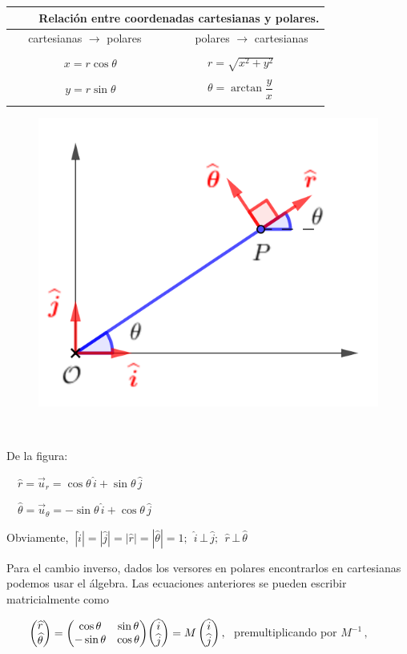 \begin{table}[H]
\centering
\begin{tabular}{|ll|}
\hline
\multicolumn{2}{|c|}{\textbf{$\qquad$ Relación entre coordenadas cartesianas y polares. }}                          \\ \hline
\multicolumn{1}{|c|}{$\quad$ cartesianas $\to$ polares $\qquad$} & $\quad$ polares $\to$ cartesianas $\ \ $ \\ \hline
\multicolumn{1}{|c|}{} & \\
\multicolumn{1}{|c|}{$x=r\cos \theta$} & $\qquad \ \ r=\sqrt{x^2+y^2}$ \\ 
\multicolumn{1}{|c|}{} & \\
\multicolumn{1}{|c|}{$y=r\sin \theta$} & $\qquad \ \  \theta = \arctan \dfrac y x$ \\ 
\multicolumn{1}{|c|}{} & \\ \hline
\end{tabular}
\end{table}

\begin{multicols}{2}
	\begin{figure}[H]
	\centering
	\includegraphics[width=.3\textwidth]{img-coordenadas/coordenadas-03.png}
	\end{figure}
	$\quad$
	
	De la figura:
	
	$\quad \widehat r=\vec u_r=\cos \theta \, \widehat i + \sin \theta \, \widehat j$
	
	$\quad \widehat \theta=\vec u_\theta=-\sin \theta \, \widehat i + \cos \theta \, \widehat j$
\end{multicols}

\color{gris}
Obviamente, $\ |\widehat i|=|\widehat j|=|\widehat r|=|\widehat \theta|=1;\ \ \widehat i \, \bot \, \widehat j;\ \ \widehat r \, \bot \, \widehat \theta$

Para el cambio inverso, dados los versores en polares encontrarlos en cartesianas podemos usar el álgebra. Las ecuaciones anteriores se pueden escribir matricialmente como 

$\qquad \mqty(\widehat r\\ \widehat \theta)= \mqty( \cos \theta & \sin \theta \\ -\sin \theta & \cos \theta) \mqty(\widehat i \\ \widehat j)=M\, \mqty(\widehat i \\ \widehat j)\, , \ $ premultiplicando por $M^{-1}\, , $

